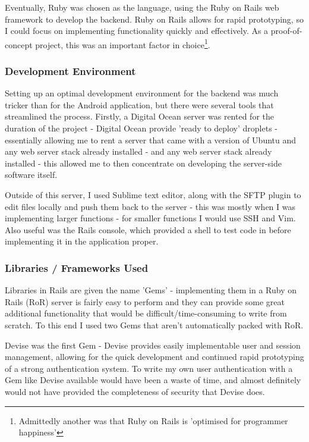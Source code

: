 \documentclass[11pt]{informatics-report}
\begin{document}
Eventually, Ruby was chosen as the language, using the Ruby on Rails web framework to develop the backend. Ruby on Rails allows for rapid prototyping, so I could focus on implementing functionality quickly and effectively. As a proof-of-concept project, this was an important factor in choice\footnote{Admittedly another was that Ruby on Rails is 'optimised for programmer happiness'}.

\subsubsection{Development Environment}

Setting up an optimal development environment for the backend was much tricker than for the Android application, but there were several tools that streamlined the process. Firstly, a Digital Ocean server was rented for the duration of the project - Digital Ocean provide 'ready to deploy' droplets - essentially allowing me to rent a server that came with a version of Ubuntu and any web server stack already installed - and any web server stack already installed - this allowed me to then concentrate on developing the server-side software itself.

Outside of this server, I used Sublime text editor, along with the SFTP plugin to edit files locally and push them back to the server - this was mostly when I was implementing larger functions - for smaller functions I would use SSH and Vim. Also useful was the Rails console, which provided a shell to test code in before implementing it in the application proper.

\subsubsection{Libraries / Frameworks Used}

Libraries in Rails are given the name 'Gems' - implementing them in a Ruby on Rails (RoR) server is fairly easy to perform and they can provide some great additional functionality that would be difficult/time-consuming to write from scratch. To this end I used two Gems that aren't automatically packed with RoR.

Devise was the first Gem - Devise provides easily implementable user and session management, allowing for the quick development and continued rapid prototyping of a strong authentication system. To write my own user authentication with a Gem like Devise available would have been a waste of time, and almost definitely would not have provided the completeness of security that Devise does. 
\end{document}
